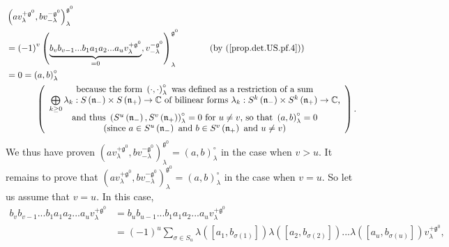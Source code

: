 \documentclass[etingof-lie.tex]{subfiles}
\begin{document}
\begin{align*}
&  \left(  av_{\lambda}^{+\mathfrak{g}^{0}},bv_{-\lambda}^{-\mathfrak{g}^{0}%
}\right)  _{\lambda}^{\mathfrak{g}^{0}}\\
&  =\left(  -1\right)  ^{v}\left(  \underbrace{b_{v}b_{v-1}...b_{1}a_{1}%
a_{2}...a_{u}v_{\lambda}^{+\mathfrak{g}^{0}}}_{=0},v_{-\lambda}^{-\mathfrak{g}%
^{0}}\right)  _{\lambda}^{\mathfrak{g}^{0}}\ \ \ \ \ \ \ \ \ \ \left(
\text{by (\ref{prop.det.US.pf.4})}\right) \\
&  =0=\left(  a,b\right)  _{\lambda}^{\circ}\\
&  \ \ \ \ \ \ \ \ \ \ \left(
\begin{array}
[c]{c}%
\text{because the form }\left(  \cdot,\cdot\right)  _{\lambda}^{\circ}\text{
was defined as a restriction of a sum}\\
\bigoplus\limits_{k\geq0}\lambda_{k}:S\left(  \mathfrak{n}_{-}\right)  \times
S\left(  \mathfrak{n}_{+}\right)  \rightarrow\mathbb{C}\text{ of bilinear
forms }\lambda_{k}:S^{k}\left(  \mathfrak{n}_{-}\right)  \times S^{k}\left(
\mathfrak{n}_{+}\right)  \rightarrow\mathbb{C}\text{,}\\
\text{and thus }\left(  S^{u}\left(  \mathfrak{n}_{-}\right)  ,S^{v}\left(
\mathfrak{n}_{+}\right)  \right)  _{\lambda}^{\circ}=0\text{ for }u\neq
v\text{, so that }\left(  a,b\right)  _{\lambda}^{\circ}=0\\
\text{(since }a\in S^{u}\left(  \mathfrak{n}_{-}\right)  \text{ and }b\in
S^{v}\left(  \mathfrak{n}_{+}\right)  \text{ and }u\neq v\text{)}%
\end{array}
\right)  .
\end{align*}
We thus have proven $\left(  av_{\lambda}^{+\mathfrak{g}^{0}},bv_{-\lambda
}^{-\mathfrak{g}^{0}}\right)  _{\lambda}^{\mathfrak{g}^{0}}=\left(
a,b\right)  _{\lambda}^{\circ}$ in the case when $v>u$. It remains to prove
that $\left(  av_{\lambda}^{+\mathfrak{g}^{0}},bv_{-\lambda}^{-\mathfrak{g}%
^{0}}\right)  _{\lambda}^{\mathfrak{g}^{0}}=\left(  a,b\right)  _{\lambda
}^{\circ}$ in the case when $v=u$. So let us assume that $v=u$. In this case,%
\begin{align*}
b_{v}b_{v-1}...b_{1}a_{1}a_{2}...a_{u}v_{\lambda}^{+\mathfrak{g}^{0}}  &
=b_{u}b_{u-1}...b_{1}a_{1}a_{2}...a_{u}v_{\lambda}^{+\mathfrak{g}^{0}}\\
&  =\left(  -1\right)  ^{u}\sum\limits_{\sigma\in S_{u}}\lambda\left(  \left[
a_{1},b_{\sigma\left(  1\right)  }\right]  \right)  \lambda\left(  \left[
a_{2},b_{\sigma\left(  2\right)  }\right]  \right)  ...\lambda\left(  \left[
a_{u},b_{\sigma\left(  u\right)  }\right]  \right)  v_{\lambda}^{+\mathfrak{g}%
^{0}},
\end{align*}
\end{document}

